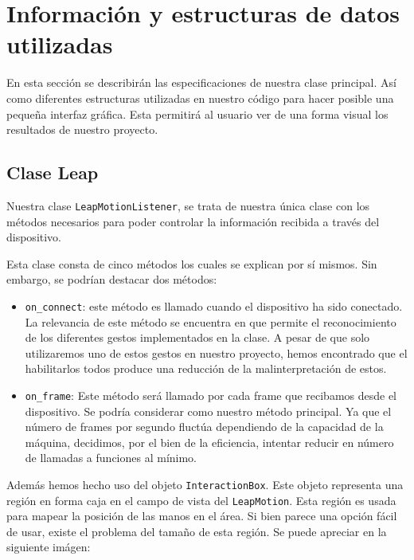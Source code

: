 \documentclass[11pt,a4paper]{article}
\begin{document}
\section{Información y estructuras de datos utilizadas}

En esta sección se describirán las especificaciones de nuestra clase principal. Así como diferentes estructuras utilizadas en nuestro código para hacer posible una pequeña interfaz gráfica. Esta permitirá al usuario ver de una forma visual los resultados de nuestro proyecto.

\subsection{Clase Leap}

Nuestra clase \texttt{LeapMotionListener}, se trata de nuestra única clase con los métodos necesarios para poder controlar la información recibida a través del dispositivo.

Esta clase consta de cinco métodos los cuales se explican por sí mismos. Sin embargo, se podrían destacar dos métodos:

\begin{itemize}[label=\textbullet]
	\item \texttt{on\_connect}: este método es llamado cuando el dispositivo ha sido conectado.
	La relevancia de este método se encuentra en que permite el reconocimiento de los diferentes gestos implementados en la clase. A pesar de que solo utilizaremos uno de estos gestos en nuestro proyecto, hemos encontrado que el habilitarlos todos produce una reducción de la malinterpretación de estos.
	\item \texttt{on\_frame}: Este método será llamado por cada frame que recibamos desde el dispositivo.
	Se podría considerar como nuestro método principal. Ya que el número de frames por segundo fluctúa dependiendo de la capacidad de la máquina, decidimos, por el bien de la eficiencia, intentar reducir en número de llamadas a funciones al mínimo.
\end{itemize}


Además hemos hecho uso del objeto \texttt{InteractionBox}. Este objeto representa una región en forma caja en el campo de vista del \texttt{LeapMotion}. Esta región es usada para mapear la posición de las manos en el área. Si bien parece una opción fácil de usar, existe el problema del tamaño de esta región. Se puede apreciar en la siguiente imágen:
\end{document}
